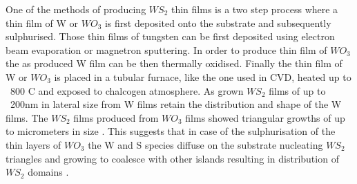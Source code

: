One of the methods of producing $WS_2$ thin films is a two step process where a thin film of W or $WO_3$ is first deposited onto the substrate and subsequently sulphurised. Those thin films of tungsten can be first deposited using electron beam evaporation or magnetron sputtering. In order to produce thin film of $WO_3$ the as produced W film can be then thermally oxidised. Finally the thin film of W or $WO_3$ is placed in a tubular furnace, like the one used in CVD, heated up to ~800 {\degree}C and exposed to chalcogen atmosphere. As grown $WS_2$ films of up to ~200nm in lateral size from W films retain the distribution and shape of the W films. The $WS_2$ films produced from $WO_3$ films showed triangular growths of up to micrometers in size . This suggests that in case of the sulphurisation of the thin layers of $WO_3$ the W and S species diffuse on the substrate nucleating $WS_2$ triangles and growing to coalesce with other islands resulting in distribution of $WS_2$ domains \cite{doi:10.1021/nn400971k}\cite{Reale2016}.
